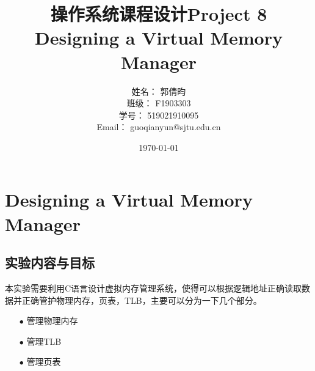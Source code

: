 \documentclass{article}
\title{\textbf{操作系统课程设计Project 8\\Designing a Virtual Memory Manager}} %
\author{姓名： 郭倩昀  
\\班级： F1903303  
\\学号： 519021910095  
\\Email： guoqianyun@sjtu.edu.cn} %
\date{\today} %
\begin{document}
\maketitle %
\tableofcontents
\newpage
\section{Designing a Virtual Memory Manager}
\subsection{实验内容与目标}
本实验需要利用C语言设计虚拟内存管理系统，使得可以根据逻辑地址正确读取数据并正确管护物理内存，页表，TLB，主要可以分为一下几个部分。
\begin{itemize}
\item[$\bullet$]管理物理内存
\item[$\bullet$]管理TLB
\item[$\bullet$]管理页表
\end{itemize}
\end{document}
